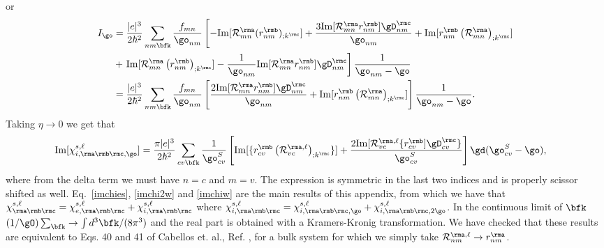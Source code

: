 or
\begin{align}\label{pfian}
I_{\go}
&=
\frac{|e|^3}{2\hbar^2}
\sum_{nm\bfk}
\frac{f_{mn}}{\go_{nm}}
\left[
-\mathrm{Im}[{\cal R}^{\rma}_{mn}(r^{\rmb}_{nm})_{;k^{\rmc}}]
+
\frac{3\mathrm{Im}[{\cal R}^{\rma}_{mn}r^{\rmb}_{nm}]\gD^{\rmc}_{nm}}{\go_{nm}}
+
\mathrm{Im}[r^{\rmb}_{nm}\left({\cal R}^{\rma}_{mn}\right)_{;k^{\rmc}}]
\right.
\nonumber\\
&+
\left.
\mathrm{Im}[
{\cal R}^{\rma}_{mn}
\left(
r^{\rmb}_{nm}
\right)_{;k^{\rmc}}
]
-
\frac{1}{\go_{nm}}
\mathrm{Im}[{\cal R}^{\rma}_{mn}r^{\rmb}_{nm}]
\gD^{\rmc}_{nm}
\right]
\frac{1}{\go_{nm}-\go}
\nonumber\\
&=
\frac{|e|^3}{2\hbar^2}
\sum_{nm\bfk}
\frac{f_{mn}}{\go_{nm}}
\left[
\frac{2\mathrm{Im}[{\cal R}^{\rma}_{mn}r^{\rmb}_{nm}]\gD^{\rmc}_{nm}}{\go_{nm}}
+
\mathrm{Im}[r^{\rmb}_{nm}\left({\cal R}^{\rma}_{mn}\right)_{;k^{\rmc}}]
\right]
\frac{1}{\go_{nm}-\go}
.
\end{align}
Taking $\eta\to 0$ we get that
\begin{align}\label{imchiw}
\mathrm{Im}[\chi_{i,\rma\rmb\rmc,\go}^{s,\ell}]
&=
\frac{\pi|e|^3}{2\hbar^2}
\sum_{cv\bfk}
\frac{1}{\go^S_{cv}}
\left[
\mathrm{Im}[\{r^{\rmb}_{cv}\left({\cal R}^{\rma,\ell}_{vc}\right)_{;k^{\rmc}}\}]
+
\frac{2\mathrm{Im}[{\cal R}^{\rma,\ell}_{vc}\{r^{\rmb}_{cv}]\gD^{\rmc}_{cv}\}}{\go^S_{cv}}
\right]
\gd(\go^S_{cv}-\go)
,
\end{align} 
where from the delta term we must have $n=c$ and $m=v$. The expression
is symmetric in the last two indices and is properly scissor shifted
as well. Eq.~\eqref{imchies}, \eqref{imchi2w} and \eqref{imchiw}
are the main results of this appendix, from which we have that
$\chi_{\rma\rmb\rmc}^{s,\ell}=\chi_{e,\rma\rmb\rmc}^{s,\ell}+\chi_{i,\rma\rmb\rmc}^{s,\ell}$ 
where
$\chi_{i,\rma\rmb\rmc}^{s,\ell}=\chi_{i,\rma\rmb\rmc,\go}^{s,\ell}+\chi_{i,\rma\rmb\rmc,2\go}^{s,\ell}$. 
In the continuous limit of $\bfk$ 
$(1/\gO)\sum_{\bfk}\to\int d^3\bfk/(8\pi^3)$ and the real part is 
obtained with a Kramers-Kronig transformation. 
We have checked that these results are equivalent to Eqs. 40 and 41 of
Cabellos et. al., Ref. \cite{cabellos_effects_2009}, for a bulk system for which we
simply take ${\cal R}^{\rma,\ell}_{nm}\to r^{\rma}_{nm}$.

